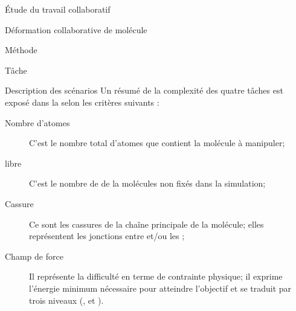\documentclass[myfrancais]{mythesis}
\begin{document}
\begin{mypart}{Étude du travail collaboratif}
\begin{mychapter}{Déformation collaborative de molécule}
\begin{mysection}{Méthode}
\begin{mysubsection}{Tâche}
\begin{mysubsubsection}{Description des scénarios}
						Un résumé de la complexité des quatre tâches est exposé dans la  selon les critères suivants :
						\begin{description}
							\item[Nombre d'atomes] C'est le nombre total d'atomes que contient la molécule à manipuler;
							\item[ libre] C'est le nombre de  de la molécules non fixés dans la simulation;
							\item[Cassure] Ce sont les cassures de la chaîne principale de la molécule; elles représentent les jonctions entre \myhelice* et/ou les \myfeuillet*;
							\item[Champ de force] Il représente la difficulté en terme de contrainte physique; il exprime l'énergie minimum nécessaire pour atteindre l'objectif et se traduit par trois niveaux (,  et ).
						\end{description}


\end{mysubsubsection}
\end{mysubsection}
\end{mysection}
\end{mychapter}
\end{mypart}
\end{document}
